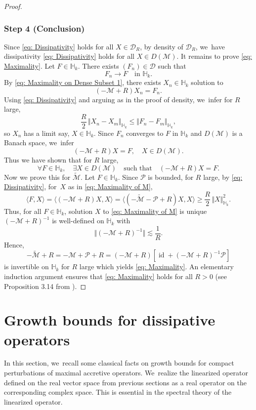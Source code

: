 \documentclass[JEP,XML,SOM,Unicode]{cedram}
\theoremstyle{plain}
\theoremstyle{definition}
\DeclareMathOperator{\id}{id}
\begin{document}
\begin{proof}
\subsubsection*{Step 4 (Conclusion)}
Since \eqref{eq: Dissipativity} holds for all $X\in \mathcal D_R$, by density of $\mathcal D_R$, we~have dissipativity \ie \eqref{eq: Dissipativity} holds for all $X\in D(\mathcal M)$. It remains to prove \eqref{eq: Maximality}. Let $F\in \mathbb H_k$. There exists $(F_n)\in \mathcal D$ such that
\[
F_n\to F\quad\text{in }\mathbb H_k.
\]
By \eqref{eq: Maximality on Dense Subset 1}, there exists $X_n\in\mathbb H_k$ solution to
\[
(-\mathcal M+R)X_n=F_n.
\]
Using \eqref{eq: Dissipativity} and arguing as in the proof of density, we~infer for $R$ large,
\[
\frac{R}{2}\,\Vert X_n-X_m\Vert_{\mathbb H_k}\le \Vert F_n-F_m\Vert_{\mathbb H_k},
\]
so $X_n$ has a limit say, $X\in \mathbb H_k$. Since $F_n$ converges to $F$ in $\mathbb H_k$ and $D(\mathcal M)$ is a Banach space, we~infer
\[
(-\mathcal M+R)X=F,\quad X\in D(\mathcal M).
\]
Thus we have shown that for $R$ large,
\begin{equation}
\label{eq: Maximality of M}
\forall F\in \mathbb H_k,\quad \exists X\in D(\mathcal M)\quad \text{such that}\quad (-\mathcal M+R)X=F.
\end{equation}
Now we prove this for $\tilde{\mathcal M}$. Let $F\in\mathbb H_k$. Since $\mathcal P$ is bounded, for $R$ large, by \eqref{eq: Dissipativity}, for~$X$ as in \eqref{eq: Maximality of M},
\[
\langle F,X\rangle =\langle(-\mathcal M+R)X,X\rangle = \langle(-\tilde{\mathcal M}-\mathcal P+R)X,X\rangle \ge \frac{R}{2}\,\Vert X\Vert_{\mathbb H_k}^2.
\]
Thus, for all $F\in \mathbb H_k$, solution $X$ to \eqref{eq: Maximality of M} is unique \ie $(-\mathcal M+R)^{-1}$ is well-defined on $\mathbb H_k$ with
\[
\Vert (-\mathcal M+R)^{-1}\Vert\lesssim \frac{1}{R}.
\]
Hence,
\[
-\tilde{\mathcal M}+R=-\mathcal M+\mathcal P+R=(-\mathcal M+R)[\id+(-\mathcal M+R)^{-1}\mathcal P]
\]
is invertible on $\mathbb H_k$ for $R$ large which yields \eqref{eq: Maximality}. An elementary induction argument ensures that \eqref{eq: Maximality} holds for all $R>0$ (see Proposition 3.14 from \cite{EN}).
\end{proof}

\section{Growth bounds for dissipative operators}
\label{sec: 6}

In this section, we~recall some classical facts on growth bounds for compact perturbations of maximal accretive operators. We~realize the linearized operator defined on the real vector space from previous sections as a real operator on the corresponding complex space. This is essential in the spectral theory of the linearized operator.
\end{document}
